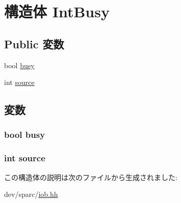 \hypertarget{structIob_1_1IntBusy}{
\section{構造体 IntBusy}
\label{structIob_1_1IntBusy}
}
\subsection*{Public 変数}
\begin{DoxyCompactItemize}
\item 
bool \hyperlink{structIob_1_1IntBusy_abbe792bb2cf67584b86443440a194f46}{busy}
\item 
int \hyperlink{structIob_1_1IntBusy_a07a87b2e6ed927503e2f95f119c9fc23}{source}
\end{DoxyCompactItemize}


\subsection{変数}
\hypertarget{structIob_1_1IntBusy_abbe792bb2cf67584b86443440a194f46}{
\subsubsection[{busy}]{\setlength{\rightskip}{0pt plus 5cm}bool {\bf busy}}}
\label{structIob_1_1IntBusy_abbe792bb2cf67584b86443440a194f46}
\hypertarget{structIob_1_1IntBusy_a07a87b2e6ed927503e2f95f119c9fc23}{
\subsubsection[{source}]{\setlength{\rightskip}{0pt plus 5cm}int {\bf source}}}
\label{structIob_1_1IntBusy_a07a87b2e6ed927503e2f95f119c9fc23}


この構造体の説明は次のファイルから生成されました:\begin{DoxyCompactItemize}
\item 
dev/sparc/\hyperlink{iob_8hh}{iob.hh}\end{DoxyCompactItemize}
